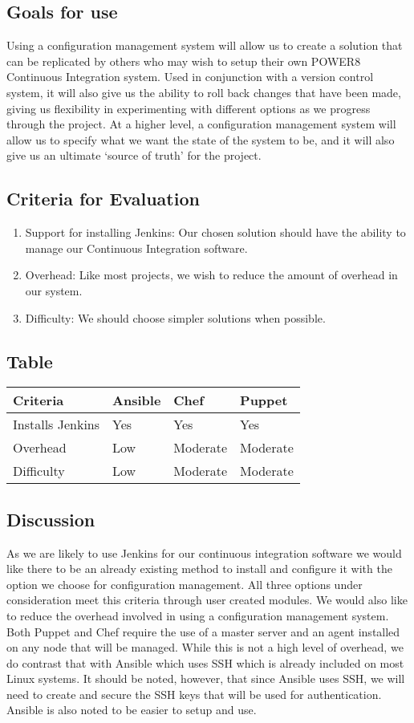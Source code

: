 \documentclass[10pt,letterpaper,onecolumn,journal]{IEEEtran}
\begin{document}
\subsection{Goals for use}
Using a configuration management system will allow us to create a solution that can be replicated by others who may wish to setup their own POWER8 Continuous Integration system.
Used in conjunction with a version control system, it will also give us the ability to roll back changes that have been made, giving us flexibility in experimenting with different options as we progress through the project. 
At a higher level, a configuration management system will allow us to specify what we want the state of the system to be, and it will also give us an ultimate `source of truth' for the project.
\subsection{Criteria for Evaluation}
\begin{enumerate}
  \item Support for installing Jenkins: Our chosen solution should have the ability to manage our Continuous Integration software. 
  \item Overhead: Like most projects, we wish to reduce the amount of overhead in our system.
  \item Difficulty: We should choose simpler solutions when possible.
\end{enumerate}
\subsection{Table}
\begin{center}
  \begin{tabular}{llll}
    Criteria & Ansible & Chef & Puppet \\ \midrule
    Installs Jenkins       & Yes & Yes & Yes \\ \midrule
    Overhead           & Low & Moderate & Moderate \\ \midrule
    Difficulty           & Low & Moderate & Moderate \\ \bottomrule
  \end{tabular}
\end{center}
\subsection{Discussion}
As we are likely to use Jenkins for our continuous integration software we would like there to be an already existing method to install and configure it with the option we choose for configuration management.
All three options under consideration meet this criteria through user created modules.
We would also like to reduce the overhead involved in using a configuration management system.
Both Puppet and Chef require the use of a master server and an agent installed on any node that will be managed.
While this is not a high level of overhead, we do contrast that with Ansible which uses SSH which is already included on most Linux systems.
It should be noted, however, that since Ansible uses SSH, we will need to create and secure the SSH keys that will be used for authentication.
Ansible is also noted to be easier to setup and use.~\cite{cmcompare}
\end{document}
